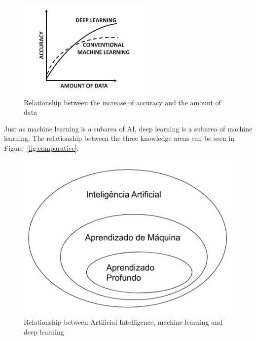 \documentclass[a4paper,fleqn]{cas-sc}
\begin{document}
\begin{figure}[h!]
	\caption{Relationship between the increase of accuracy and the amount of data}
	\label{fig:rel_deep}
	\centering%
	\begin{minipage}{.4\textwidth}
		\includegraphics[width=\textwidth]{images/acc_deep_aggarwal.png}
	\end{minipage}
\end{figure}

Just as machine learning is a subarea of AI, deep learning is a subarea of machine learning. The relationship between the three knowledge areas can be seen in Figure~\ref{fig:comparative}.

\begin{figure}[h!]
	\caption{Relationship between Artificial Intelligence, machine learning and deep learning}
	\label{fig:comparativo}
	\centering%
	\begin{minipage}{.5\textwidth}
		\includegraphics[width=\textwidth]{images/ai_ml_dl.png}
	\end{minipage}
\end{figure}
\end{document}
